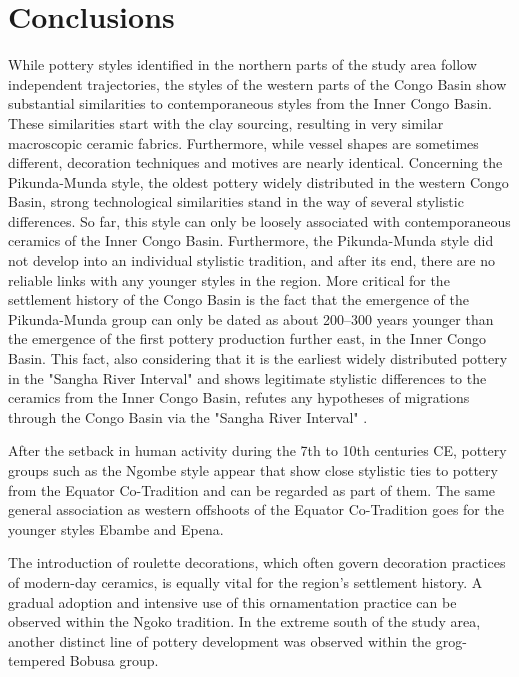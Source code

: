 \documentclass[smallextended,natbib]{svjour3}       %
\begin{document}
\section*{Conclusions}

While pottery styles identified in the northern parts of the study area follow independent trajectories, the styles of the western parts of the Congo Basin show substantial similarities to contemporaneous styles from the Inner Congo Basin. These similarities start with the clay sourcing, resulting in very similar macroscopic ceramic fabrics. Furthermore, while vessel shapes are sometimes different, decoration techniques and motives are nearly identical. Concerning the Pikunda-Munda style, the oldest pottery widely distributed in the western Congo Basin, strong technological similarities stand in the way of several stylistic differences. So far, this style can only be loosely associated with contemporaneous ceramics of the Inner Congo Basin. Furthermore, the Pikunda-Munda style did not develop into an individual stylistic tradition, and after its end, there are no reliable links with any younger styles in the region. More critical for the settlement history of the Congo Basin is the fact that the emergence of the Pikunda-Munda group can only be dated as about 200--300 years younger than the emergence of the first pottery production further east, in the Inner Congo Basin. This fact, also considering that it is the earliest widely distributed pottery in the "Sangha River Interval" and shows legitimate stylistic differences to the ceramics from the Inner Congo Basin, refutes any hypotheses of migrations through the Congo Basin via the "Sangha River Interval" \citep{Bostoen.2015,Grollemund.2015,Grollemund.2023}.

After the setback in human activity during the 7th to 10th centuries CE, pottery groups such as the Ngombe style appear that show close stylistic ties to pottery from the Equator Co-Tradition and can be regarded as part of them. The same general association as western offshoots of the Equator Co-Tradition goes for the younger styles Ebambe and Epena.

The introduction of roulette decorations, which often govern decoration practices of modern-day ceramics, is equally vital for the region's settlement history. A gradual adoption and intensive use of this ornamentation practice can be observed within the Ngoko tradition. In the extreme south of the study area, another distinct line of pottery development was observed within the grog-tempered Bobusa group.
\end{document}

